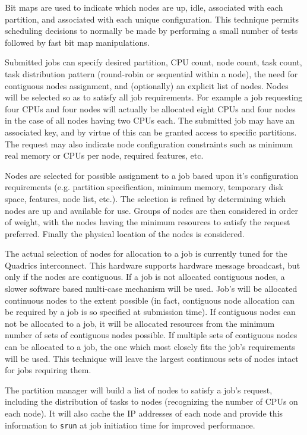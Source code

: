 Bit maps are used to indicate which nodes are up, idle, associated with 
each partition, and associated with each unique configuration. 
This technique permits scheduling decisions to normally be made by 
performing a small number of tests followed by fast bit map manipulations. 

Submitted jobs can specify desired partition, CPU count, node count, task 
count, task distribution pattern (round-robin or sequential within a node), 
the need for contiguous nodes assignment, and (optionally) an explicit list of nodes. 
Nodes will be selected so as to satisfy all job requirements. 
For example a job requesting four CPUs and four nodes will actually 
be allocated eight CPUs and four nodes in the case of all nodes having 
two CPUs each.
The submitted job may have an associated key, and by virtue of this can 
be granted access to specific partitions. 
The request may also indicate node configuration constraints such 
as minimum real memory or CPUs per node, required features, etc.

Nodes are selected for possible assignment to a job based upon 
it's configuration requirements (e.g. partition specification, 
minimum memory, temporary disk space, features, node list, etc.). 
The selection is refined by determining which nodes are up and 
available for use. 
Groups of nodes are then considered in order of weight, with 
the nodes having the minimum resources to satisfy the request 
preferred. 
Finally the physical location of the nodes is considered. 

The actual selection of nodes for allocation to a job is currently 
tuned for the Quadrics interconnect. 
This hardware supports hardware message broadcast, but only if 
the nodes are contiguous. 
If a job is not allocated contiguous nodes, a slower software 
based multi-case mechanism will be used.
Job's will be allocated continuous nodes to the extent possible 
(in fact, contiguous node allocation can be required by a job 
is so specified at submission time). 
If contiguous nodes can not be allocated to a job, it will be 
allocated resources from the minimum number of sets of contiguous 
nodes possible. 
If multiple sets of contiguous nodes can be allocated to a 
job, the one which most closely fits the job's requirements 
will be used. 
This technique will leave the largest continuous sets of nodes 
intact for jobs requiring them.

The partition manager will build a list of nodes to satisfy a job's 
request, including the distribution of tasks to nodes (recognizing the 
number of CPUs on each node). 
It will also cache the IP addresses of each node and provide this information 
to {\tt srun} at job initiation time for improved performance.

